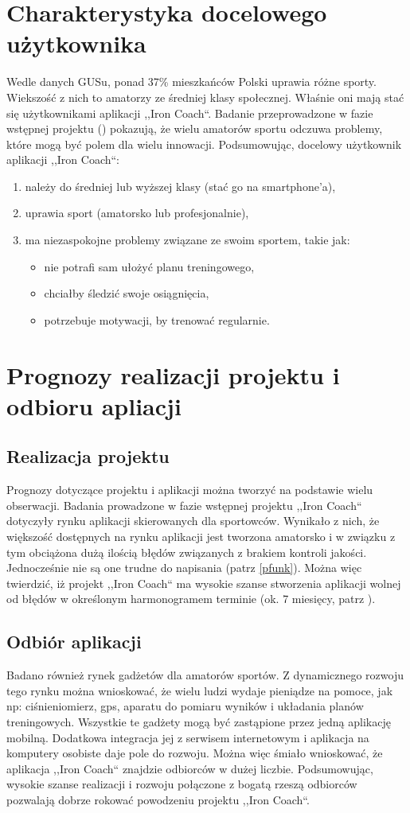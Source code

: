\section{Charakterystyka docelowego użytkownika}
\noindent Wedle danych GUSu, ponad 37\% mieszkańców Polski uprawia różne sporty. Wiekszość z nich to amatorzy ze średniej klasy społecznej. Właśnie oni mają stać się użytkownikami aplikacji ,,Iron Coach``. Badanie przeprowadzone w fazie wstępnej projektu (\cite{Ba}) pokazują, że wielu amatorów sportu odczuwa problemy, które mogą być polem dla wielu innowacji.
Podsumowując, docelowy użytkownik aplikacji ,,Iron Coach``:
\begin{enumerate}
  \item należy do średniej lub wyższej klasy (stać go na smartphone'a),
  \item uprawia sport (amatorsko lub profesjonalnie),
  \item ma niezaspokojne problemy związane ze swoim sportem, takie jak:
    \begin{itemize}
      \item nie potrafi sam ułożyć planu treningowego,
      \item chciałby śledzić swoje osiągnięcia,
      \item potrzebuje motywacji, by trenować regularnie.
    \end{itemize}
\end{enumerate}
\section{Prognozy realizacji projektu i odbioru apliacji}
\subsection{Realizacja projektu}
\noindent Prognozy dotyczące projektu i aplikacji można tworzyć na podstawie wielu obserwacji. Badania prowadzone w fazie wstępnej projektu ,,Iron Coach`` \cite{Ba} dotyczyły rynku aplikacji skierowanych dla sportowców. Wynikało z nich, że większość dostępnych na rynku aplikacji jest tworzona amatorsko i w związku z tym obciążona dużą ilością błędów związanych z brakiem kontroli jakości. Jednocześnie nie są one trudne do napisania (patrz \ref{pfunk}). Można więc twierdzić, iż projekt ,,Iron Coach`` ma wysokie szanse stworzenia aplikacji wolnej od błędów w określonym harmonogramem terminie (ok. 7 miesięcy, patrz \cite{Ha}). 
\subsection{Odbiór aplikacji}
\noindent Badano również rynek gadżetów dla amatorów sportów. Z dynamicznego rozwoju tego rynku można wnioskować, że wielu ludzi wydaje pieniądze na pomoce, jak np: ciśnieniomierz, gps, aparatu do pomiaru wyników i układania planów treningowych. Wszystkie te gadżety mogą być zastąpione przez jedną aplikację mobilną. Dodatkowa integracja jej z serwisem internetowym i aplikacja na komputery osobiste daje pole do rozwoju. Można więc śmiało wnioskować, że aplikacja ,,Iron Coach`` znajdzie odbiorców w dużej liczbie. 
Podsumowując, wysokie szanse realizacji i rozwoju połączone z bogatą rzeszą odbiorców pozwalają dobrze rokować powodzeniu projektu ,,Iron Coach``.
